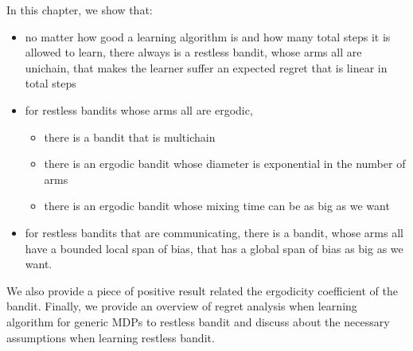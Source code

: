 

In this chapter, we show that:
\begin{itemize}
    \item no matter how good a learning algorithm is and how many total steps it is allowed to learn, there always is a restless bandit, whose arms all are unichain, that makes the learner suffer an expected regret that is linear in total steps
    \item for restless bandits whose arms all are ergodic,
        \begin{itemize}
            \item there is a bandit that is multichain
            \item there is an ergodic bandit whose diameter is exponential in the number of arms
            \item there is an ergodic bandit whose mixing time can be as big as we want
        \end{itemize}
    \item for restless bandits that are communicating, there is a bandit, whose arms all have a bounded local span of bias, that has a global span of bias as big as we want.
\end{itemize}
We also provide a piece of positive result related the ergodicity coefficient of the bandit.
Finally, we provide an overview of regret analysis when learning algorithm for generic MDPs to restless bandit and discuss about the necessary assumptions when learning restless bandit.



